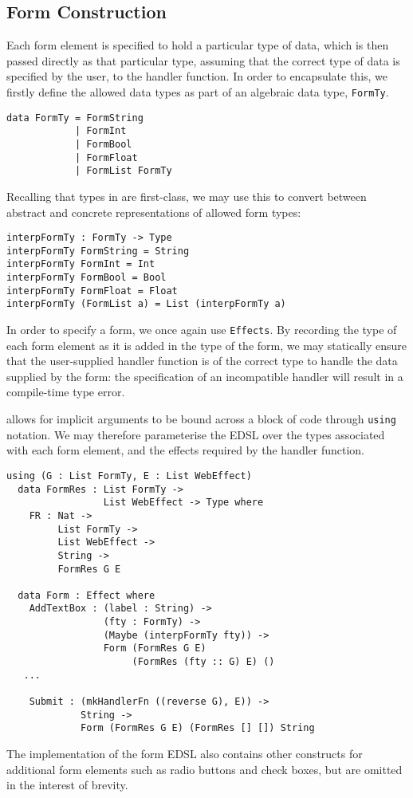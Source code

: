 \documentclass[preprint]{sigplanconf}
\begin{document}
\subsection{Form Construction}
Each form element is specified to hold a particular type of data, which is then passed directly as that particular type, assuming that the correct type of data is specified by the user, to the handler function. In order to encapsulate this, we firstly define the allowed data types as part of an algebraic data type, \texttt{FormTy}.
{\small
\begin{verbatim}
data FormTy = FormString
            | FormInt
            | FormBool
            | FormFloat
            | FormList FormTy 
\end{verbatim}
}
Recalling that types in \idris{} are first-class, we may use this to convert between abstract and concrete representations of allowed form types:
{\small
\begin{verbatim}
interpFormTy : FormTy -> Type
interpFormTy FormString = String
interpFormTy FormInt = Int
interpFormTy FormBool = Bool
interpFormTy FormFloat = Float
interpFormTy (FormList a) = List (interpFormTy a)
\end{verbatim}
}
%
In order to specify a form, we once again use \texttt{Effects}. By recording the type of each form element as it is added in the type of the form, we may statically ensure that the user-supplied handler function is of the correct type to handle the data supplied by the form: the specification of an incompatible handler will result in a compile-time type error.

\idris{} allows for implicit arguments to be bound across a block of code through \texttt{using} notation. We may therefore parameterise the EDSL over the types associated with each form element, and the effects required by the handler function.

{\small
\begin{verbatim}
using (G : List FormTy, E : List WebEffect)
  data FormRes : List FormTy -> 
                 List WebEffect -> Type where
    FR : Nat -> 
         List FormTy -> 
         List WebEffect -> 
         String -> 
         FormRes G E
  
  data Form : Effect where
    AddTextBox : (label : String) -> 
                 (fty : FormTy) -> 
                 (Maybe (interpFormTy fty)) -> 
                 Form (FormRes G E) 
                      (FormRes (fty :: G) E) () 
   ...
   
    Submit : (mkHandlerFn ((reverse G), E)) ->
             String -> 
             Form (FormRes G E) (FormRes [] []) String
\end{verbatim}
}
The implementation of the form EDSL also contains other constructs for additional form elements such as radio buttons and check boxes, but are omitted in the interest of brevity.
\end{document}
